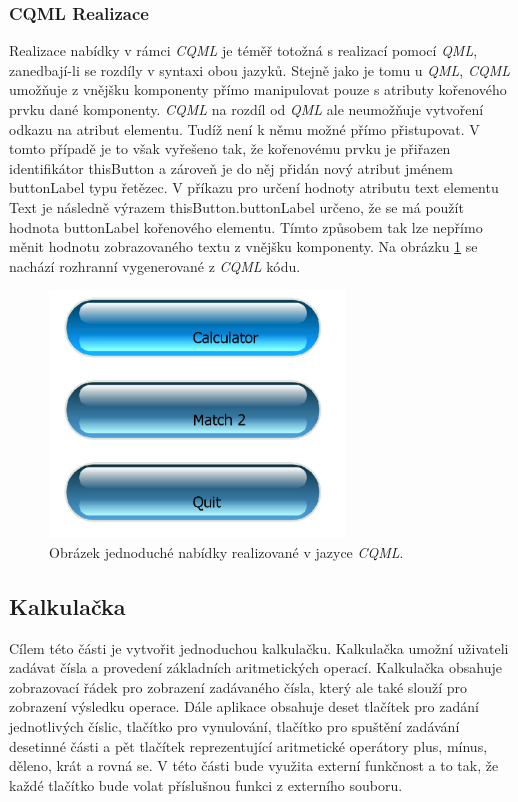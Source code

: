 \documentclass[11pt,twoside,a4paper]{book}
\begin{document}
{{\begin{ttemize}
{{\begin{lastlisting}[frame=single,caption=Řešení v pseudokódu problematického použití operátoru "." v přiřazovacím výroku,label=lst:var0N]
\subsubsection{CQML Realizace}
Realizace nabídky v rámci \textit{CQML} je téměř totožná s realizací pomocí \textit{QML}, zanedbají-li se rozdíly v syntaxi obou jazyků.
Stejně jako je tomu u \textit{QML}, \textit{CQML} umožňuje z vnějšku komponenty přímo manipulovat pouze s atributy kořenového prvku dané komponenty. \textit{CQML} na rozdíl od \textit{QML} ale neumožňuje vytvoření odkazu na atribut elementu. Tudíž není k němu možné přímo přistupovat.  V tomto případě je to však vyřešeno tak, že kořenovému prvku je přiřazen identifikátor thisButton a zároveň je do něj přidán nový atribut jménem buttonLabel typu řetězec. V příkazu pro určení hodnoty atributu text elementu Text je následně výrazem thisButton.buttonLabel určeno, že se má použít hodnota buttonLabel kořenového elementu. Tímto způsobem tak lze nepřímo měnit hodnotu zobrazovaného textu z vnějšku komponenty. Na obrázku \ref{fig:outMenuCQML} se nachází rozhranní vygenerované z \textit{CQML} kódu.
\begin{figure}[!ht]
\begin{center}
  \includegraphics[width=0.7\textwidth]{cqmlMenu}
\caption{{\label{fig:outMenuCQML}}Obrázek jednoduché nabídky realizované v jazyce \textit{CQML}.}
\end{center}
\end{figure}

\subsection{Kalkulačka}
Cílem této části je vytvořit jednoduchou kalkulačku. Kalkulačka umožní uživateli zadávat čísla a provedení základních aritmetických operací. Kalkulačka obsahuje zobrazovací řádek pro zobrazení zadávaného čísla, který ale také slouží pro zobrazení výsledku operace. Dále aplikace obsahuje deset tlačítek pro zadání jednotlivých číslic, tlačítko pro vynulování, tlačítko pro spuštění zadávání desetinné části a pět tlačítek reprezentující aritmetické operátory plus, mínus, děleno, krát a rovná se. V této části bude využita externí funkčnost a to tak, že každé tlačítko bude volat příslušnou funkci z externího souboru.

\end{lastlisting}}}
\end{ttemize}}}
\end{document}
